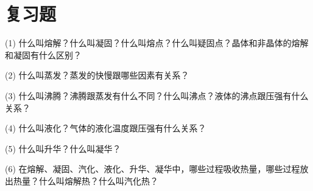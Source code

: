 \section*{复习题}

(1) 什么叫熔解？什么叫凝固？什么叫熔点？什么叫疑固点？晶体和非晶体的熔解和凝固有什么区别？

(2) 什么叫蒸发？蒸发的快慢跟哪些因素有关系？

(3) 什么叫沸腾？沸腾跟蒸发有什么不同？什么叫沸点？液体的沸点跟压强有什么关系？

(4) 什么叫液化？气体的液化温度跟压强有什么关系？

(5) 什么叫升华？什么叫凝华？

(6) 在熔解、凝固、汽化、液化、升华、凝华中，哪些过程吸收热量，哪些过程放出热量？什么叫熔解热？什么叫汽化热？

